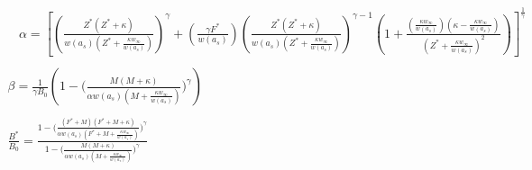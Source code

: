 \documentclass[ xcolor = pdftex, dvipsnames, table ]{beamer}
\newcommand{\kr}{ \frac{\kappa w_\infty}{w(a_s)} }
\newcommand{\one}{
        \left(\frac{Z(Z+\kappa)}{\alpha w(a_s)(Z+\kr)}\right)^\gamma
}
\newcommand{\two}{
        \left(\frac{\gamma F}{\alpha w(a_s)}\right) \left(\frac{Z(Z+\kappa)}{\alpha w(a_s)(Z+\kr)}\right)^{\gamma-1}
}
\newcommand{\thr}{
        \frac{\left(\kr\right)\left(\kappa-\kr\right)}{(Z+\kr)^2}
}
\newcommand{\oneA}{
        \left(\frac{Z^*(Z^*+\kappa)}{w(a_s)(Z^*+\kr)}\right)^\gamma
}
\newcommand{\twoA}{
        \left(\frac{\gamma F^*}{w(a_s)}\right) \left(\frac{Z^*(Z^*+\kappa)}{w(a_s)(Z^*+\kr)}\right)^{\gamma-1}
}
\newcommand{\thrA}{
        \frac{\left(\kr\right)\left(\kappa-\kr\right)}{(Z^*+\kr)^2}
}
\begin{document}
%
\begin{frame}


%
\begingroup
\tiny
\begin{gather*}
~~~~ \alpha  = \left[ \oneA + \twoA \left( 1 + \thrA \right) \right]^{\frac{1}{\gamma}} \label{aDelay}\\ ~\\
\beta = \frac{1}{\gamma B_0} \left( 1 - \Big(\frac{M (M + \kappa)}{\alpha w(a_s)(M + \kr)}\Big)^\gamma\right) \\ ~\\
\frac{B^*}{B_0} = \frac{ 1 - \Big(\frac{(F^* + M) (F^* + M + \kappa)}{\alpha w(a_s)(F^* + M + \kr)}\Big)^\gamma }{ 1 - \Big(\frac{M (M + \kappa)}{\alpha w(a_s)(M + \kr)}\Big)^\gamma }
\end{gather*}
\endgroup


\begin{center}
\end{center}

\end{frame}
\end{document}
